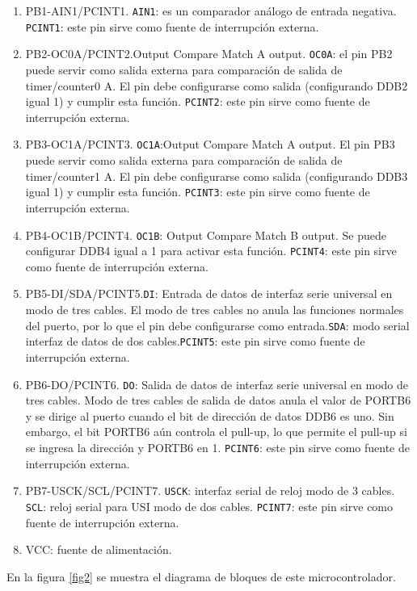 \begin{enumerate}
\item PB1-AIN1/PCINT1. \texttt{AIN1}: es un comparador análogo de entrada negativa. \texttt{PCINT1}: este pin sirve como fuente de interrupción externa.
\item PB2-OC0A/PCINT2.Output Compare Match A output. \texttt{OC0A}: el pin PB2 puede servir como salida externa para comparación de salida de timer/counter0 A. El pin debe configurarse como salida (configurando DDB2 igual 1) y cumplir esta función. \texttt{PCINT2}: este pin sirve como fuente de interrupción externa.
\item PB3-OC1A/PCINT3. \texttt{OC1A}:Output Compare Match A output. El pin PB3 puede servir como salida externa para comparación de salida de timer/counter1 A. El pin debe configurarse como salida (configurando DDB3 igual 1) y cumplir esta función. \texttt{PCINT3}: este pin sirve como fuente de interrupción externa.
\item PB4-OC1B/PCINT4. \texttt{OC1B}: Output Compare Match B output. Se puede configurar DDB4 igual a 1 para activar esta función. \texttt{PCINT4}: este pin sirve como fuente de interrupción externa.
\item PB5-DI/SDA/PCINT5.\texttt{DI}: Entrada de datos de interfaz serie universal en modo de tres cables. El modo de tres cables no anula las funciones normales del puerto, por lo que el pin debe configurarse como entrada.\texttt{SDA}: modo serial interfaz de datos de dos cables.\texttt{PCINT5}: este pin sirve como fuente de interrupción externa.
\item PB6-DO/PCINT6. \texttt{DO}: Salida de datos de interfaz serie universal en modo de tres cables. Modo de tres cables de salida de datos anula el valor de PORTB6 y se dirige al puerto cuando el bit de dirección de datos DDB6 es uno. Sin embargo, el bit PORTB6 aún controla el pull-up, lo que permite el pull-up si se ingresa la dirección y PORTB6 en 1. \texttt{PCINT6}: este pin sirve como fuente de interrupción externa.
\item PB7-USCK/SCL/PCINT7. \texttt{USCK}: interfaz serial de reloj modo de 3 cables. \texttt{SCL}: reloj serial para USI modo de dos cables. \texttt{PCINT7}: este pin sirve como fuente de interrupción externa.
\item VCC: fuente de alimentación.
\end{enumerate}
En la figura \ref{fig2} se muestra el diagrama de bloques de este microcontrolador.
